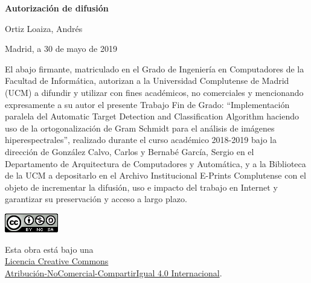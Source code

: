 
\newpage

\thispagestyle{empty}

\begin{center}

{\bf \Huge Autorización de difusión}

\vspace{1cm}


   {\large Ortiz Loaiza, Andrés}\\

   \vspace{0.5cm}

% 
   Madrid, a 30 de mayo de 2019\\

   \vspace{0.5cm} \end{center}

El abajo firmante, matriculado en el Grado de Ingeniería en Computadores de la
Facultad de Informática, autorizan a la Universidad Complutense de Madrid (UCM) a
difundir y utilizar con fines académicos, no comerciales y mencionando
expresamente a su autor el presente Trabajo Fin de Grado: “Implementación paralela del Automatic Target Detection and Classification Algorithm haciendo uso de la ortogonalización de Gram Schmidt para el análisis de imágenes hiperespectrales”, realizado
durante el curso académico 2018-2019 bajo la dirección de González Calvo, Carlos y Bernabé García, Sergio en el Departamento de Arquitectura de Computadores y Automática, y a la
Biblioteca de la UCM a depositarlo en el Archivo Institucional E-Prints
Complutense con el objeto de incrementar la difusión, uso e impacto del trabajo
en Internet y garantizar su preservación y acceso a largo plazo.

{
\begin{center}
\vfill
\includegraphics{images/copy_right/cc-by-nc-sa.png}
\tiny

Esta obra está bajo una\\
\href{http://creativecommons.org/licenses/by-nc-sa/4.0/}{Licencia Creative Commons\\Atribución-NoComercial-CompartirIgual 4.0 Internacional}.
\end{center}
}